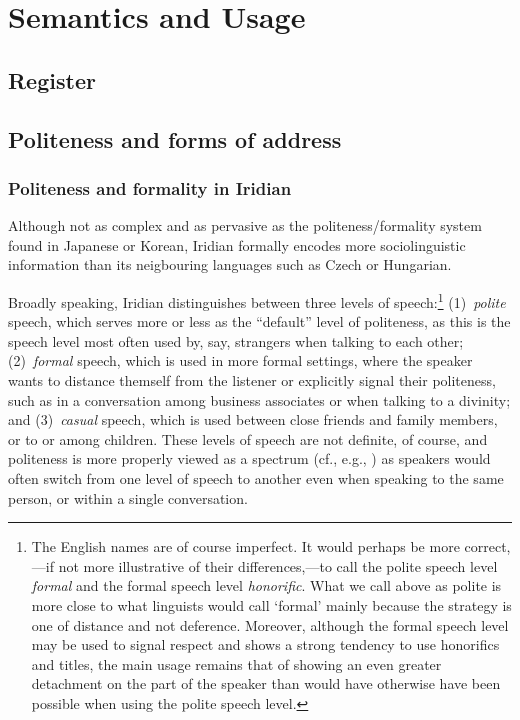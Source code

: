 \chapter{Semantics and Usage}

\section{Register}
\section{Politeness and forms of address}\label{sec:politaddr}

\subsection{Politeness and formality in Iridian}

Although not as complex and as pervasive as the politeness/formality system found in Japanese or Korean, Iridian formally encodes more sociolinguistic information than its neigbouring languages such as Czech or Hungarian.

Broadly speaking, Iridian distinguishes between three levels of speech:\footnote{
	The English names are of course imperfect. It would perhaps be more correct,---if not more illustrative of their differences,---to call the polite speech level \emph{formal} and the formal speech level \emph{honorific}. What we call above as polite is more close to what linguists would call `formal' mainly because the strategy is one of distance and not deference. Moreover, although the formal speech level may be used to signal respect and shows a strong tendency to use honorifics and titles, the main usage remains that of showing an even greater detachment on the part of the speaker than would have otherwise have been possible when using the polite speech level.
} (1)~\emph{polite} speech, which serves more or less as the ``default'' level of politeness, as this is the speech level most often used by, say, strangers when talking to each other; (2)~\emph{formal} speech, which is used in more formal settings, where the speaker wants to distance themself from the listener or explicitly signal their politeness, such as in a conversation among business associates or when talking to a divinity; and (3)~\emph{casual} speech, which is used between close friends and family members, or to or among children. These levels of speech are not definite, of course, and politeness is more properly viewed as a spectrum (cf., e.g., \cite{hansonjap}) as speakers would often switch from one level of speech to another even when speaking to the same person, or within a single conversation.

